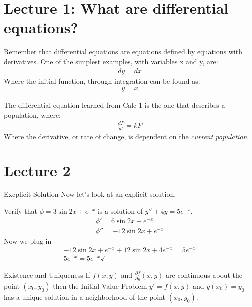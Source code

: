 \section{Lecture 1: What are differential equations?}

Remember that differential equations are equations defined by equations with derivatives. One of the simplest examples, with variables x and y, are:
\begin{align*}
    dy=dx
\end{align*}
Where the initial function, through integration can be found as:
\begin{align*}
    y=x
\end{align*}

The differential equation learned from Calc 1 is the one that describes a population, where:
\begin{align*}
    \frac{dP}{dt}=kP
\end{align*}
Where the derivative, or rate of change, is dependent on the \emph{current population}.

\section{Lecture 2}
\begin{example}{Excplicit Solution}{}
    Now let's look at an explicit solution. \par
    Verify that $\phi = 3\sin 2x + e^{-x}$ is a solution of $y'' + 4y = 5e^{-x}$.
    \begin{align*}
        \phi ' = 6\sin {2x} - e^{-x} \\
        \phi '' = -12\sin {2x} + e^{-x} 
    \end{align*}
    Now we plug in
    \begin{gather*}
        -12\sin {2x} + e^{-x} + 12\sin 2x + 4e^{-x} = 5e^{-x} \\
        5e^{-x} = 5e^{-x} \checkmark
    \end{gather*}
\end{example}

\begin{theorem}{Existence and Uniqueness}{}
    If $f(x,y)$ and $\frac{\partial f}{\partial y}(x,y)$ are continuous about the point $(x_0, y_0)$ then the Initial Value Problem $y' = f(x,y)$ and $y(x_0) = y_0$ has a unique solution in a neighborhood of the point $(x_0,y_0)$.
\end{theorem}

